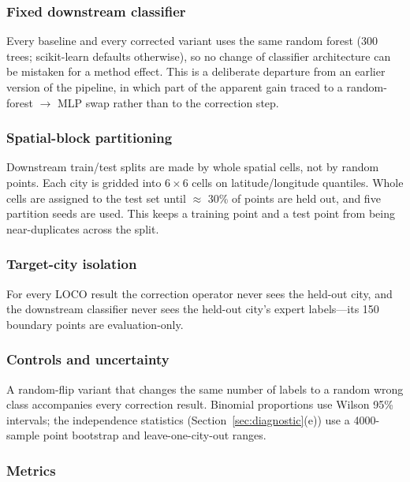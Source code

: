 \subsubsection*{Fixed downstream classifier}

Every baseline and every corrected variant uses the same random forest (300
trees; scikit-learn defaults otherwise), so no change of classifier
architecture can be mistaken for a method effect. This is a deliberate
departure from an earlier version of the pipeline, in which part of the apparent
gain traced to a random-forest $\to$ MLP swap rather than to the correction
step.

\subsubsection*{Spatial-block partitioning}

Downstream train/test splits are made by whole spatial cells, not by random
points. Each city is gridded into $6 \times 6$ cells on latitude/longitude
quantiles. Whole cells are assigned to the test set until $\approx$ 30\% of
points are held out, and five partition seeds are used. This keeps a training
point and a test point from being near-duplicates across the split.

\subsubsection*{Target-city isolation}

For every LOCO result the correction operator never sees the held-out city, and
the downstream classifier never sees the held-out city's expert labels---its 150
boundary points are evaluation-only.

\subsubsection*{Controls and uncertainty}

A random-flip variant that changes the same number of labels to a random wrong
class accompanies every correction result. Binomial proportions use Wilson 95\%
intervals; the independence statistics (Section~\ref{sec:diagnostic}(e)) use a
4000-sample point bootstrap and leave-one-city-out ranges.

\subsubsection*{Metrics}

